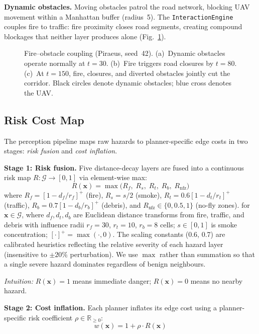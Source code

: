 \documentclass[conference]{IEEEtran}
\begin{document}
\textbf{Dynamic obstacles.} Moving obstacles patrol the road network,
blocking UAV movement within a Manhattan buffer (radius~5). The
\texttt{InteractionEngine} couples fire to traffic: fire proximity closes
road segments, creating compound blockages that neither layer produces
alone (Fig.~\ref{fig:traffic}).

\begin{figure}[!t]
  \centering
  \caption{Fire--obstacle coupling (Piraeus, seed~42). (a)~Dynamic
    obstacles operate normally at $t{=}30$. (b)~Fire triggers road
    closures by $t{=}80$. (c)~At $t{=}150$, fire, closures, and diverted
    obstacles jointly cut the corridor. Black circles denote dynamic
    obstacles; blue cross denotes the UAV\@.}
  \label{fig:traffic}
\end{figure}

\subsection{Risk Cost Map}\label{sec:riskmap}

The perception pipeline maps raw hazards to planner-specific edge costs
in two stages: \emph{risk fusion} and \emph{cost inflation}.

\textbf{Stage 1: Risk fusion.} Five distance-decay layers are fused into a
continuous risk map $R: \mathcal{G} \to [0,1]$ via element-wise max:
\begin{equation}\label{eq:risk}
  R(\mathbf{x}) = \max\bigl(R_f,\; R_s,\; R_t,\; R_b,\; R_{\text{nfz}}\bigr)
\end{equation}
where $R_f{=}[1{-}d_f/r_f]^+$ (fire), $R_s{=}s/2$ (smoke),
$R_t{=}0.6[1{-}d_t/r_t]^+$ (traffic), $R_b{=}0.7[1{-}d_b/r_b]^+$
(debris), and $R_{\text{nfz}} \in \{0, 0.5, 1\}$ (no-fly zones).
for $\mathbf{x} \in \mathcal{G}$, where $d_f, d_t, d_b$ are Euclidean
distance transforms from fire, traffic, and debris with influence radii
$r_f{=}30$, $r_t{=}10$, $r_b{=}8$ cells; $s \in [0,1]$ is smoke
concentration; $[\cdot]^{+}{=}\max(\cdot,0)$. The scaling constants
(0.6, 0.7) are calibrated heuristics reflecting the relative severity
of each hazard layer (insensitive to $\pm 20\%$ perturbation). We use
$\max$ rather than summation so that a single severe hazard dominates
regardless of benign neighbours.

\emph{Intuition:} $R(\mathbf{x}){=}1$ means immediate danger;
$R(\mathbf{x}){=}0$ means no nearby hazard.

\textbf{Stage 2: Cost inflation.} Each planner inflates its edge cost
using a planner-specific risk coefficient $\rho \in \mathbb{R}_{\geq 0}$:
\begin{equation}\label{eq:cost}
  w(\mathbf{x}) = 1 + \rho \cdot R(\mathbf{x})
\end{equation}
\end{document}
